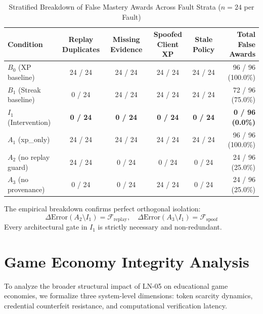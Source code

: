 \documentclass[11pt,a4paper]{article}
\begin{document}
\begin{table}[htbp]
\centering
\small
\caption{Stratified Breakdown of False Mastery Awards Across Fault Strata ($n = 24$ per Fault)}
\label{tab:fault-breakdown}
\begin{tabular}{lccccr}
\toprule
Condition & Replay Duplicates & Missing Evidence & Spoofed Client XP & Stale Policy & Total False Awards \\
\midrule
$B_0$ (XP baseline) & 24 / 24 & 24 / 24 & 24 / 24 & 24 / 24 & 96 / 96 (100.0\%) \\
$B_1$ (Streak baseline) & 0 / 24 & 24 / 24 & 24 / 24 & 24 / 24 & 72 / 96 (75.0\%) \\
$I_1$ (Intervention) & \textbf{0 / 24} & \textbf{0 / 24} & \textbf{0 / 24} & \textbf{0 / 24} & \textbf{0 / 96 (0.0\%)} \\
$A_1$ (xp\_only) & 24 / 24 & 24 / 24 & 24 / 24 & 24 / 24 & 96 / 96 (100.0\%) \\
$A_2$ (no replay guard) & 24 / 24 & 0 / 24 & 0 / 24 & 0 / 24 & 24 / 96 (25.0\%) \\
$A_3$ (no provenance) & 0 / 24 & 0 / 24 & 24 / 24 & 0 / 24 & 24 / 96 (25.0\%) \\
\bottomrule
\end{tabular}
\end{table}

The empirical breakdown confirms perfect orthogonal isolation:
\begin{equation}
\Delta \text{Error}(A_2 \setminus I_1) = \mathcal{F}_{\text{replay}}, \quad \Delta \text{Error}(A_3 \setminus I_1) = \mathcal{F}_{\text{spoof}}
\end{equation}
Every architectural gate in $I_1$ is strictly necessary and non-redundant.

\section{Game Economy Integrity Analysis}

To analyze the broader structural impact of LN-05 on educational game economies, we formalize three system-level dimensions: token scarcity dynamics, credential counterfeit resistance, and computational verification latency.
\end{document}

